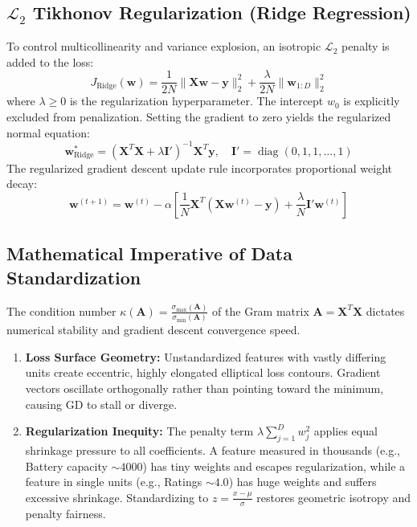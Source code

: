 \documentclass[12pt,a4paper]{article}
\begin{document}
\subsection{\texorpdfstring{$\mathcal{L}_2$ Tikhonov Regularization (Ridge Regression)}{L2 Regularization (Ridge Regression)}}
To control multicollinearity and variance explosion, an isotropic $\mathcal{L}_2$ penalty is added to the loss:
\begin{equation}
J_{\text{Ridge}}(\mathbf{w}) = \frac{1}{2N} \|\mathbf{X}\mathbf{w} - \mathbf{y}\|_2^2 + \frac{\lambda}{2N} \|\mathbf{w}_{1:D}\|_2^2
\end{equation}
where $\lambda \ge 0$ is the regularization hyperparameter. The intercept $w_0$ is explicitly excluded from penalization. Setting the gradient to zero yields the regularized normal equation:
\begin{equation}
\mathbf{w}_{\text{Ridge}}^* = (\mathbf{X}^T\mathbf{X} + \lambda \mathbf{I}')^{-1} \mathbf{X}^T\mathbf{y}, \quad \mathbf{I}' = \operatorname{diag}(0, 1, 1, \dots, 1)
\end{equation}
The regularized gradient descent update rule incorporates proportional weight decay:
\begin{equation}
\mathbf{w}^{(t+1)} = \mathbf{w}^{(t)} - \alpha \left[ \frac{1}{N}\mathbf{X}^T(\mathbf{X}\mathbf{w}^{(t)} - \mathbf{y}) + \frac{\lambda}{N} \mathbf{I}' \mathbf{w}^{(t)} \right]
\end{equation}

\subsection{Mathematical Imperative of Data Standardization}
The condition number $\kappa(\mathbf{A}) = \frac{\sigma_{\max}(\mathbf{A})}{\sigma_{\min}(\mathbf{A})}$ of the Gram matrix $\mathbf{A} = \mathbf{X}^T\mathbf{X}$ dictates numerical stability and gradient descent convergence speed.
\begin{enumerate}
    \item \textbf{Loss Surface Geometry:} Unstandardized features with vastly differing units create eccentric, highly elongated elliptical loss contours. Gradient vectors oscillate orthogonally rather than pointing toward the minimum, causing GD to stall or diverge.
    \item \textbf{Regularization Inequity:} The penalty term $\lambda \sum_{j=1}^D w_j^2$ applies equal shrinkage pressure to all coefficients. A feature measured in thousands (e.g., Battery capacity $\sim 4000$) has tiny weights and escapes regularization, while a feature in single units (e.g., Ratings $\sim 4.0$) has huge weights and suffers excessive shrinkage. Standardizing to $z = \frac{x - \mu}{\sigma}$ restores geometric isotropy and penalty fairness.
\end{enumerate}
\end{document}
